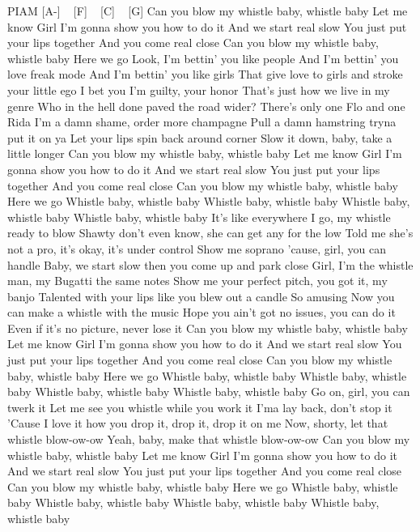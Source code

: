 PIAM
[A-] ~ [F] ~ [C] ~ [G]
Can you blow my whistle baby, whistle baby
Let me know
Girl I'm gonna show you how to do it
And we start real slow
You just put your lips together
And you come real close
Can you blow my whistle baby, whistle baby
Here we go
Look, I'm bettin' you like people
And I'm bettin' you love freak mode
And I'm bettin' you like girls
That give love to girls and stroke your little ego
I bet you I'm guilty, your honor
That's just how we live in my genre
Who in the hell done paved the road wider?
There's only one Flo and one Rida
I'm a damn shame, order more champagne
Pull a damn hamstring tryna put it on ya
Let your lips spin back around corner
Slow it down, baby, take a little longer
Can you blow my whistle baby, whistle baby
Let me know
Girl I'm gonna show you how to do it
And we start real slow
You just put your lips together
And you come real close
Can you blow my whistle baby, whistle baby
Here we go
Whistle baby, whistle baby
Whistle baby, whistle baby
Whistle baby, whistle baby
Whistle baby, whistle baby
It's like everywhere I go, my whistle ready to blow
Shawty don't even know, she can get any for the low
Told me she's not a pro, it's okay, it's under control
Show me soprano 'cause, girl, you can handle
Baby, we start slow then you come up and park close
Girl, I'm the whistle man, my Bugatti the same notes
Show me your perfect pitch, you got it, my banjo
Talented with your lips like you blew out a candle
So amusing
Now you can make a whistle with the music
Hope you ain't got no issues, you can do it
Even if it's no picture, never lose it
Can you blow my whistle baby, whistle baby
Let me know
Girl I'm gonna show you how to do it
And we start real slow
You just put your lips together
And you come real close
Can you blow my whistle baby, whistle baby
Here we go
Whistle baby, whistle baby
Whistle baby, whistle baby
Whistle baby, whistle baby
Whistle baby, whistle baby
Go on, girl, you can twerk it
Let me see you whistle while you work it
I'ma lay back, don't stop it
'Cause I love it how you drop it, drop it, drop it on me
Now, shorty, let that whistle blow-ow-ow
Yeah, baby, make that whistle blow-ow-ow
Can you blow my whistle baby, whistle baby
Let me know
Girl I'm gonna show you how to do it
And we start real slow
You just put your lips together
And you come real close
Can you blow my whistle baby, whistle baby
Here we go
Whistle baby, whistle baby
Whistle baby, whistle baby
Whistle baby, whistle baby
Whistle baby, whistle baby